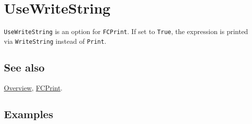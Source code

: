 \documentclass[../FeynCalcManual.tex]{subfiles}
\begin{document}
\hypertarget{usewritestring}{%
\section{UseWriteString}\label{usewritestring}}

\texttt{UseWriteString} is an option for \texttt{FCPrint}. If set to
\texttt{True}, the expression is printed via \texttt{WriteString}
instead of \texttt{Print}.

\subsection{See also}

\hyperlink{toc}{Overview}, \hyperlink{fcprint}{FCPrint}.

\subsection{Examples}
\end{document}
